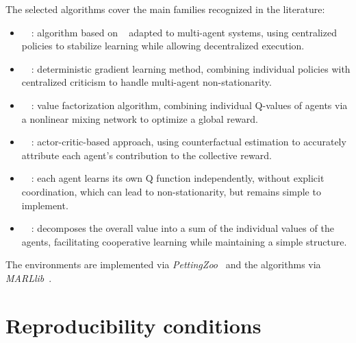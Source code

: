 The selected  algorithms cover the main families recognized in the literature:
\begin{itemize}
  \item {}~\cite{Yu2022}~: algorithm based on ~\cite{Schulman2017} adapted to multi-agent systems, using centralized policies to stabilize learning while allowing decentralized execution.
  \item {}~\cite{lowe2017multi}~: deterministic gradient learning method, combining individual policies with centralized criticism to handle multi-agent non-stationarity.
  \item {}~\cite{rashid2018qmix}~: value factorization algorithm, combining individual Q-values of agents via a nonlinear mixing network to optimize a global reward.
  \item {}~\cite{foerster2018counterfactual}~: actor-critic-based approach, using counterfactual estimation to accurately attribute each agent's contribution to the collective reward.
  \item {}~\cite{Jiang2022}~: each agent learns its own Q function independently, without explicit coordination, which can lead to non-stationarity, but remains simple to implement.
  \item {}~\cite{sunehag2018value}~: decomposes the overall value into a sum of the individual values of the agents, facilitating cooperative learning while maintaining a simple structure.
\end{itemize}
The environments are implemented via \textit{PettingZoo}~\cite{terry2020pettingzoo} and the algorithms via \textit{MARLlib}~\cite {hu2022marllib}.

\section{Reproducibility conditions}

